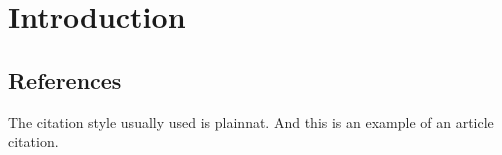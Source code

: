 \chapter{Introduction}
\section{References}
The citation style usually used is plainnat. 
And this is an example of an article citation\cite{einstein}.


